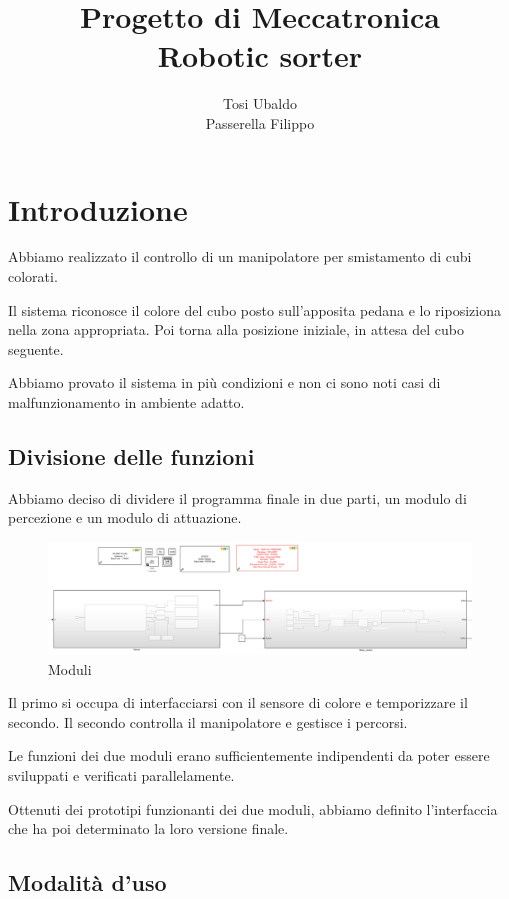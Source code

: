 \documentclass[12pt]{report}
\title{{Progetto di Meccatronica}\\{Robotic sorter}}
\author{{Tosi Ubaldo}\\{Passerella Filippo}}
\begin{document}
\maketitle

\tableofcontents

\chapter{Introduzione}

Abbiamo realizzato il controllo di un manipolatore per smistamento di cubi colorati.

Il sistema riconosce il colore del cubo posto sull'apposita pedana e lo riposiziona nella zona appropriata. Poi torna alla posizione iniziale, in attesa del cubo seguente.

Abbiamo provato il sistema in più condizioni e non ci sono noti casi di malfunzionamento in ambiente adatto.

\section{Divisione delle funzioni}

Abbiamo deciso di dividere il programma finale in due parti, un modulo di percezione e un modulo di attuazione.

\begin{figure}
\includegraphics[width=\textwidth]{Modules}
\caption{Moduli}
\end{figure}

Il primo si occupa di interfacciarsi con il sensore di colore e temporizzare il secondo. Il secondo controlla il manipolatore e gestisce i percorsi.

Le funzioni dei due moduli erano sufficientemente indipendenti da poter essere sviluppati e verificati parallelamente.

Ottenuti dei prototipi funzionanti dei due moduli, abbiamo definito l'interfaccia che ha poi determinato la loro versione finale.

\section{Modalità d'uso}
\end{document}

